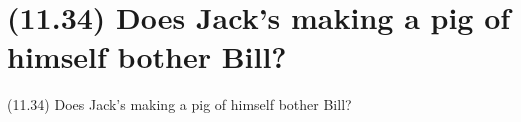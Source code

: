 \documentclass{article}
\begin{document}
%
%

\section*{(11.34) Does Jack's making a pig of himself bother Bill?}

\bigbreak
\begin{enumerate*}
\item[(11.34)] Does Jack's making a pig of himself bother Bill?
\end{enumerate*}
\bigbreak
\end{document}
